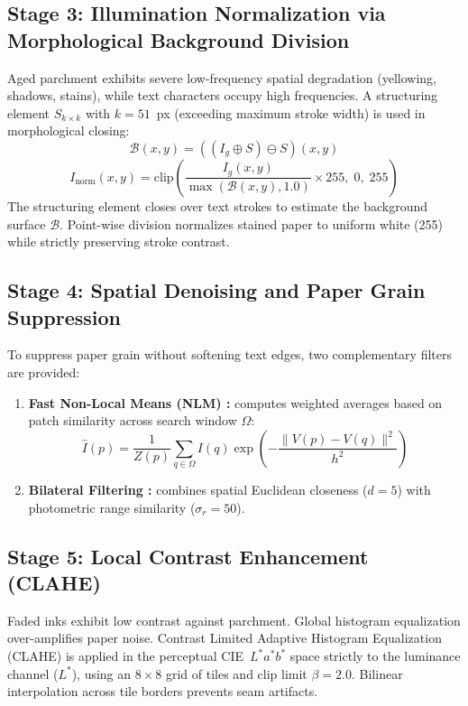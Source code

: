 \documentclass[11pt, a4paper]{article}
\begin{document}
\subsection{Stage 3: Illumination Normalization via Morphological Background Division}
Aged parchment exhibits severe low-frequency spatial degradation (yellowing, shadows, stains), while text characters occupy high frequencies. A structuring element $S_{k \times k}$ with $k = 51$~px (exceeding maximum stroke width) is used in morphological closing:
\begin{equation}
\mathcal{B}(x, y) = ((I_g \oplus S) \ominus S)(x, y)
\end{equation}
\begin{equation}
I_{\text{norm}}(x, y) = \text{clip}\left( \frac{I_g(x, y)}{\max(\mathcal{B}(x, y), 1.0)} \times 255, \; 0, \; 255 \right)
\end{equation}
The structuring element closes over text strokes to estimate the background surface $\mathcal{B}$. Point-wise division normalizes stained paper to uniform white (255) while strictly preserving stroke contrast.

\subsection{Stage 4: Spatial Denoising and Paper Grain Suppression}
To suppress paper grain without softening text edges, two complementary filters are provided:
\begin{enumerate}
    \item \textbf{Fast Non-Local Means (NLM) \cite{buades2005}:} computes weighted averages based on patch similarity across search window $\Omega$:
    \begin{equation}
    \hat{I}(p) = \frac{1}{Z(p)} \sum_{q \in \Omega} I(q) \exp\left( -\frac{\|V(p) - V(q)\|^2}{h^2} \right)
    \end{equation}
    \item \textbf{Bilateral Filtering \cite{tomasi1998}:} combines spatial Euclidean closeness ($d = 5$) with photometric range similarity ($\sigma_r = 50$).
\end{enumerate}

\subsection{Stage 5: Local Contrast Enhancement (CLAHE)}
Faded inks exhibit low contrast against parchment. Global histogram equalization over-amplifies paper noise. Contrast Limited Adaptive Histogram Equalization (CLAHE) \cite{zuiderveld1994} is applied in the perceptual CIE~$L^*a^*b^*$ space strictly to the luminance channel ($L^*$), using an $8 \times 8$ grid of tiles and clip limit $\beta = 2.0$. Bilinear interpolation across tile borders prevents seam artifacts.
\end{document}
